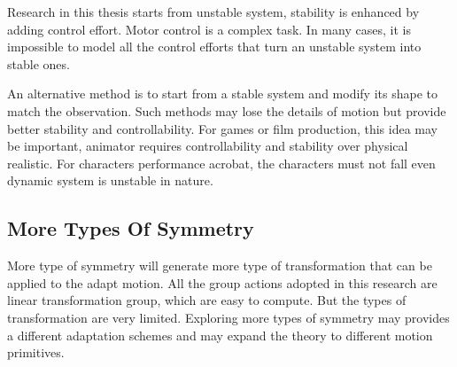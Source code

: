 Research in this thesis starts from unstable system,  stability is enhanced by adding control effort.
Motor control is a complex task. 
In many cases, it is impossible to model all the control efforts that turn an unstable system into stable ones.


An alternative method is to start from a stable system and modify its shape to match the observation.
Such methods may lose the details of motion but provide better stability and controllability. 
For games or film production, this idea may be important, animator requires controllability and stability over physical realistic.
For characters performance acrobat, the characters must not fall even dynamic system is unstable in nature.




\subsection{More Types Of Symmetry}
More type of symmetry will generate more type of transformation that can be applied  to the adapt motion.
All the group actions adopted in this research are linear transformation group, which are easy to compute.
But the types of transformation are very limited.
Exploring more types of symmetry may provides a different adaptation schemes and may expand the theory to different motion primitives.
